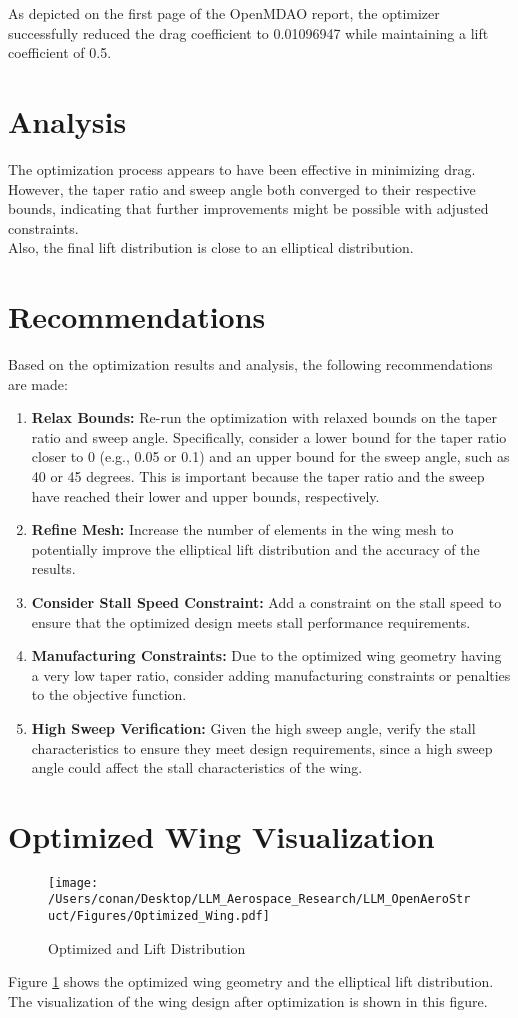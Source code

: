 \documentclass{article}
\begin{document}
As depicted on the first page of the OpenMDAO report, the optimizer successfully reduced the drag coefficient to 0.01096947 while maintaining a lift coefficient of 0.5.

\section{Analysis}
The optimization process appears to have been effective in minimizing drag. However, the taper ratio and sweep angle both converged to their respective bounds, indicating that further improvements might be possible with adjusted constraints. \\ Also, the final lift distribution is close to an elliptical distribution.

\section{Recommendations}
Based on the optimization results and analysis, the following recommendations are made:

\begin{enumerate}
    \item \textbf{Relax Bounds:} Re-run the optimization with relaxed bounds on the taper ratio and sweep angle. Specifically, consider a lower bound for the taper ratio closer to 0 (e.g., 0.05 or 0.1) and an upper bound for the sweep angle, such as 40 or 45 degrees. This is important because the taper ratio and the sweep have reached their lower and upper bounds, respectively.
    \item \textbf{Refine Mesh:} Increase the number of elements in the wing mesh to potentially improve the elliptical lift distribution and the accuracy of the results.
    \item \textbf{Consider Stall Speed Constraint:} Add a constraint on the stall speed to ensure that the optimized design meets stall performance requirements.
    \item \textbf{Manufacturing Constraints:} Due to the optimized wing geometry having a very low taper ratio, consider adding manufacturing constraints or penalties to the objective function.
    \item \textbf{High Sweep Verification:} Given the high sweep angle, verify the stall characteristics to ensure they meet design requirements, since a high sweep angle could affect the stall characteristics of the wing.
\end{enumerate}

\section{Optimized Wing Visualization}
\begin{figure}[h!]
    \centering
    \texttt{[image: /Users/conan/Desktop/LLM\_Aerospace\_Research/LLM\_OpenAeroStruct/Figures/Optimized\_Wing.pdf]}
    \caption{Optimized and Lift Distribution}
    \label{fig:optimized_wing}
\end{figure}

Figure \ref{fig:optimized_wing} shows the optimized wing geometry and the elliptical lift distribution. The visualization of the wing design after optimization is shown in this figure.
\end{document}
